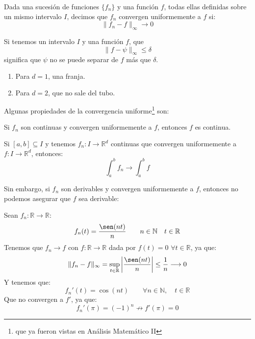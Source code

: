 \begin{definicion}
    Dada una sucesión de funciones $\{f_n\}$ y una función $f$, todas ellas definidas sobre un mismo intervalo $I$, decimos que $f_n$ convergen uniformemente a $f$ si:
    \begin{equation*}
        \|f_n - f\|_\infty \rightarrow 0
    \end{equation*}
\end{definicion}

\begin{ejemplo}
    Si tenemos un intervalo $I$ y una función $f$, que 
    \begin{equation*}
        \|f-\psi\|_\infty \leq \delta
    \end{equation*}
    significa que $\psi$ no se puede separar de $f$ más que $\delta$.
    \begin{enumerate}
        \item Para $d=1$, una franja.
        \item Para $d=2$, que no sale del tubo.
    \end{enumerate}
\end{ejemplo}

\noindent
Algunas propiedades de la convergencia uniforme\footnote{que ya fueron vistas en Análisis Matemático II} son:
\begin{prop}
    Si $f_n$ son continuas y convergen uniformemente a $f$, entonces $f$ es continua.
\end{prop}

\begin{prop}
    Si $[a,b]\subseteq I$ y tenemos $f_n:I\rightarrow\mathbb{R}^d$ continuas que convergen uniformemente a $f:I\rightarrow\mathbb{R}^d$, entonces:
    \begin{equation*}
        \int_{a}^{b} f_n \rightarrow \int_a^b f
    \end{equation*}
\end{prop}

Sin embargo, si $f_n$ son derivables y convergen uniformemente a $f$, entonces no podemos asegurar que $f$ sea derivable:
\begin{ejemplo}
    Sean $f_n:\mathbb{R}\rightarrow\mathbb{R}$:
    \begin{equation*}
        f_n(t) = \dfrac{\sen(nt)}{n} \qquad n\in \mathbb{N} \quad t\in \mathbb{R}
    \end{equation*}
    Tenemos que $f_n\rightarrow f$ con $f:\mathbb{R}\rightarrow\mathbb{R}$ dada por $f(t) = 0$ $\forall t\in \mathbb{R}$, ya que:
    \begin{equation*}
        \|f_n - f\|_\infty = \sup_{t\in \mathbb{R}} \left|\dfrac{\sen(nt)}{n}\right| \leq \dfrac{1}{n} \longrightarrow 0
    \end{equation*}
    Y tenemos que:
    \begin{equation*}
        f_n'(t) = \cos(nt) \qquad \forall n\in \mathbb{N}, \quad t\in \mathbb{R}
    \end{equation*}
    Que no convergen a $f'$, ya que:
    \begin{equation*}
        f_n'(\pi) = {(-1)}^{n} \not\rightarrow f'(\pi) = 0
    \end{equation*}
\end{ejemplo}

